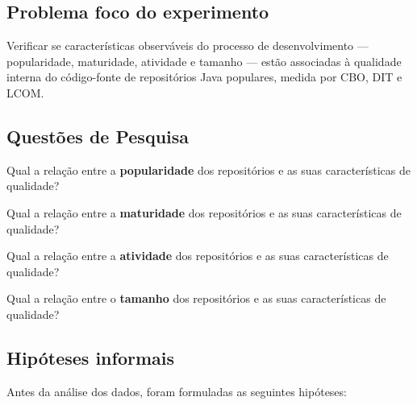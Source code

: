 \documentclass[12pt,a4paper]{article}
\begin{document}
\subsection{Problema foco do experimento}

Verificar se características observáveis do processo de desenvolvimento — popularidade, maturidade, atividade e tamanho — estão associadas à qualidade interna do código-fonte de repositórios Java populares, medida por CBO, DIT e LCOM.

\subsection{Questões de Pesquisa}

\begin{description}[style=nextline, leftmargin=1.5cm]
    \item[\textbf{RQ01}] Qual a relação entre a \textbf{popularidade} dos repositórios e as suas características de qualidade?
    \item[\textbf{RQ02}] Qual a relação entre a \textbf{maturidade} dos repositórios e as suas características de qualidade?
    \item[\textbf{RQ03}] Qual a relação entre a \textbf{atividade} dos repositórios e as suas características de qualidade?
    \item[\textbf{RQ04}] Qual a relação entre o \textbf{tamanho} dos repositórios e as suas características de qualidade?
\end{description}

\subsection{Hipóteses informais}

Antes da análise dos dados, foram formuladas as seguintes hipóteses:
\end{document}
